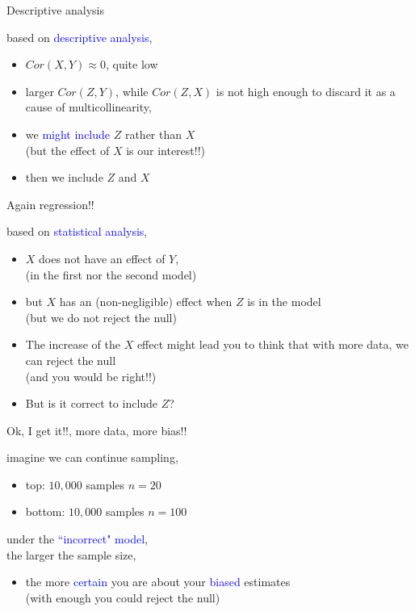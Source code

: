 %
%
\begin{lhframe}[rhgraphic={\texttt{[image: collider2\_panel.pdf]}}]
	{Descriptive analysis}
	
	based on \textcolor{blue}{descriptive analysis},
	\begin{itemize}
		\item $Cor(X, Y) \approx 0$, quite low
		\item larger $Cor(Z,Y)$, while $Cor(Z,X)$ is not high enough to discard it as a cause of multicollinearity,
		\item we \textcolor{blue}{might include} $Z$ rather than $X$ \\
		{\small (but the effect of $X$ is our interest!!)}
		\item then we include $Z$ and $X$
	\end{itemize}
\end{lhframe}
%
%
\begin{lhframe}[rhgraphic={\texttt{[image: collider2\_reg.png]}}]
	{Again regression!!}
	
	based on \textcolor{blue}{statistical analysis},
	\begin{itemize}
		\item $X$ does not have an effect of $Y$, \\
		{\small (in the first nor the second model)}
		\item but $X$ has an (non-negligible) effect when $Z$ is in the model \\
		{\small (but we do not reject the null)}
		\item The increase of the $X$ effect might lead you to think that with more data, we can reject the null \\
		{\small (and you would be right!!)} \\
		\item But is it correct to include $Z$?
	\end{itemize}
\end{lhframe}
%
%
\begin{lhframe}[rhgraphic={\texttt{[image: collider2\_samplesize.pdf]}}]
	{Ok, I get it!!, more data, more bias!!}
	
	imagine we can continue sampling,
	\begin{itemize}
		\item top: $10,000$ samples $n=20$
		\item bottom: $10,000$ samples $n=100$
	\end{itemize}
	
	under the \textcolor{blue}{``incorrect" model}, \\
	the larger the sample size,
	\begin{itemize}
		\item the more \textcolor{blue}{certain} you are about your \textcolor{blue}{biased} estimates \\
		{\small (with enough you could reject the null)}
	\end{itemize}
\end{lhframe}

